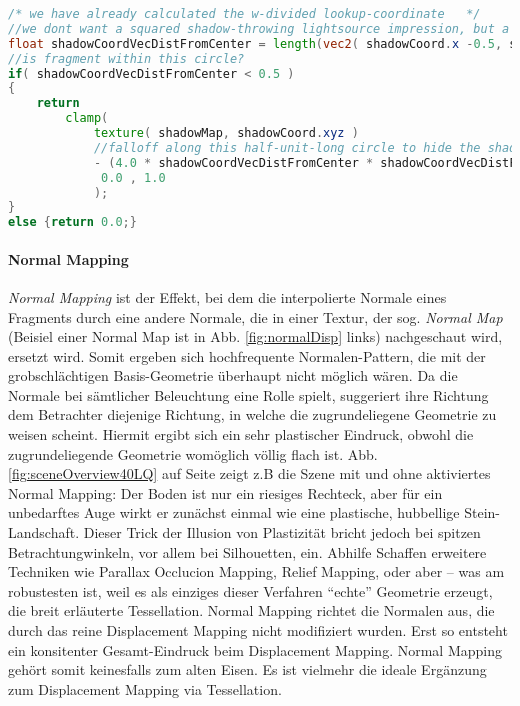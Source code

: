 		\begin{lstlisting}[language=GLSL]
/* we have already calculated the w-divided lookup-coordinate	*/
//we dont want a squared shadow-throwing lightsource impression, but a smmoth circled one:  
float shadowCoordVecDistFromCenter = length(vec2( shadowCoord.x -0.5, shadowCoord.y -0.5));
//is fragment within this circle?
if( shadowCoordVecDistFromCenter < 0.5 )
{
	return  
		clamp(
			texture( shadowMap, shadowCoord.xyz ) 
            //falloff along this half-unit-long circle to hide the shadow maps limited domain
            - (4.0 * shadowCoordVecDistFromCenter * shadowCoordVecDistFromCenter  ),
             0.0 , 1.0
            ); 
}
else {return 0.0;}
	\end{lstlisting}
	
	
	
	\paragraph{Normal Mapping}
	\label{par:normalMapping}
	\emph{Normal Mapping} ist der Effekt, bei dem die interpolierte Normale eines Fragments durch eine andere
	Normale, die in einer Textur, der sog. \emph{Normal Map} 
	(Beisiel einer Normal Map ist in Abb. \ref{fig:normalDisp} links)
	nachgeschaut wird, ersetzt wird. 
	Somit ergeben sich hochfrequente Normalen-Pattern, die mit der grobschlächtigen Basis-Geometrie 
	überhaupt nicht möglich wären. Da die Normale bei sämtlicher Beleuchtung eine Rolle spielt, 
	suggeriert ihre Richtung dem Betrachter diejenige Richtung, in welche die zugrundeliegene 
	Geometrie zu weisen scheint. Hiermit ergibt sich ein sehr plastischer Eindruck, obwohl die 
	zugrundeliegende Geometrie womöglich völlig flach ist.
	Abb. \ref{fig:sceneOverview40LQ} auf Seite \pageref{fig:sceneOverview40LQ}
	zeigt z.B die Szene mit und ohne aktiviertes Normal Mapping: 
	Der	Boden ist nur ein riesiges Rechteck, aber für ein unbedarftes Auge wirkt er zunächst einmal wie eine plastische,
	hubbellige Stein-Landschaft. Dieser Trick der Illusion von Plastizität bricht jedoch bei spitzen
	Betrachtungwinkeln, vor allem bei Silhouetten, ein. Abhilfe Schaffen erweitere Techniken wie Parallax Occlucion
	Mapping, Relief Mapping, oder aber -- was am robustesten ist, weil es als einziges dieser Verfahren "`echte"' Geometrie
	erzeugt, die breit erläuterte Tessellation. Normal Mapping richtet die Normalen aus, die durch das reine
	Displacement Mapping nicht modifiziert wurden. Erst so entsteht ein konsitenter Gesamt-Eindruck beim Displacement 
	Mapping. Normal Mapping gehört somit keinesfalls zum alten Eisen. Es ist vielmehr die ideale Ergänzung zum Displacement
	Mapping via Tessellation.\\
	
